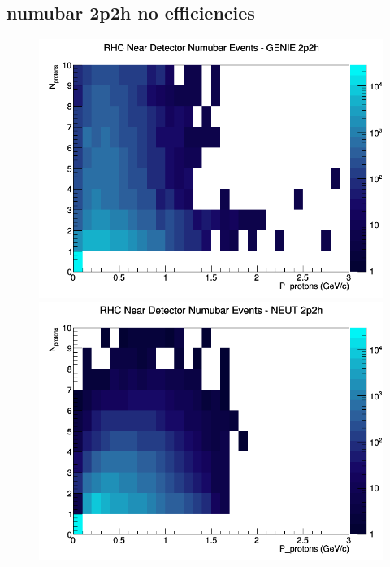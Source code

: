 \documentclass[12pt]{article}
\begin{document}
\subsection{numubar 2p2h no efficiencies}
\begin{figure}[h]
\includegraphics[width=\linewidth]{N_P/nominal/protons/2p2h_RHC_ND_numubar_N_P_GENIE.png}
\endminipage
{}
\includegraphics[width=\linewidth]{N_P/nominal/protons/2p2h_RHC_ND_numubar_N_P_NEUT.png}
\endminipage
{}

\end{figure}
\end{document}
